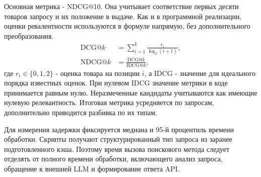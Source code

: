 \documentclass{misisarticle}
\begin{document}
Основная метрика - NDCG@10. Она учитывает соответствие первых десяти товаров запросу и их положение в выдаче. Как и в программной реализации, оценки ревалентности используются в формуле напрямую, без дополнительного преобразования.
\begin{equation}
\begin{aligned}
\mathrm{DCG}@k&=\sum_{i=1}^{k}\frac{r_i}{\log_2(i+1)},\\
\mathrm{NDCG}@k&=\frac{\mathrm{DCG}@k}{\mathrm{IDCG}@k},
\end{aligned}
\label{eq:ndcg}
\end{equation}
где $r_i\in\{0,1,2\}$ - оценка товара на позиции $i$, а IDCG - значение для идеального порядка известных оценок. При нулевом IDCG значение метрики в коде принимается равным нулю. Неразмеченные кандидаты учитываются как имеющие нулевую релевантность. Итоговая метрика усредняется по запросам, дополнительно приводится разбивка по их типам.

Для измерения задержки фиксируется медиана и 95-й процентиль времени обработки. Скрипты получают структурированный тип запроса из заранее подготовленного кэша. Поэтому время вызова поискового метода следует отделять от полного времени обработки, включающего анализ запроса, обращение к внешней LLM и формирование ответа API. 
\end{document}
